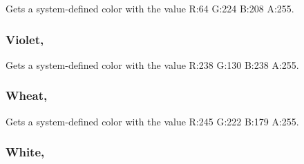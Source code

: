 Gets a system-\/defined color with the value R\+:64 G\+:224 B\+:208 A\+:255.

\hypertarget{structMicrosoft_1_1Xna_1_1Framework_1_1Color_abaf62a768000d22346bfca589db91189}{}
\subsubsection[{Violet}]{ Violet\hspace{0.3cm}{\ttfamily [static]}, {\ttfamily [get]}}\label{structMicrosoft_1_1Xna_1_1Framework_1_1Color_abaf62a768000d22346bfca589db91189}


Gets a system-\/defined color with the value R\+:238 G\+:130 B\+:238 A\+:255.

\hypertarget{structMicrosoft_1_1Xna_1_1Framework_1_1Color_a78d7d69e5ea955359ccda6a975481df3}{}
\subsubsection[{Wheat}]{ Wheat\hspace{0.3cm}{\ttfamily [static]}, {\ttfamily [get]}}\label{structMicrosoft_1_1Xna_1_1Framework_1_1Color_a78d7d69e5ea955359ccda6a975481df3}


Gets a system-\/defined color with the value R\+:245 G\+:222 B\+:179 A\+:255.

\hypertarget{structMicrosoft_1_1Xna_1_1Framework_1_1Color_ac586768e5306fcce5ef5a07fcb012e0d}{}
\subsubsection[{White}]{ White\hspace{0.3cm}{\ttfamily [static]}, {\ttfamily [get]}}\label{structMicrosoft_1_1Xna_1_1Framework_1_1Color_ac586768e5306fcce5ef5a07fcb012e0d}


